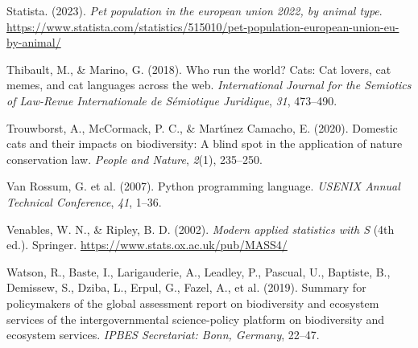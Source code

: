 \documentclass[
  man,
  longtable,
  nolmodern,
  notxfonts,
  notimes,
  colorlinks=true,linkcolor=blue,citecolor=blue,urlcolor=blue]{apa7}
\newlength{\cslhangindent}
\newenvironment{CSLReferences}[2] %
 {\begin{list}{}{%
  \setlength{\itemindent}{0pt}
  \setlength{\leftmargin}{0pt}
  \setlength{\parsep}{0pt}
  \ifodd #1
   \setlength{\leftmargin}{\cslhangindent}
   \setlength{\itemindent}{-1\cslhangindent}
  \fi
  \setlength{\itemsep}{#2\baselineskip}}}
 {\end{list}}
\begin{document}
\begin{CSLReferences}{1}{0}
Statista. (2023). \emph{Pet population in the european union 2022, by
animal type}.
\url{https://www.statista.com/statistics/515010/pet-population-european-union-eu-by-animal/}

Thibault, M., \& Marino, G. (2018). Who run the world? Cats: Cat lovers,
cat memes, and cat languages across the web. \emph{International Journal
for the Semiotics of Law-Revue Internationale de S{é}miotique
Juridique}, \emph{31}, 473--490.

Trouwborst, A., McCormack, P. C., \& Martı́nez Camacho, E. (2020).
Domestic cats and their impacts on biodiversity: A blind spot in the
application of nature conservation law. \emph{People and Nature},
\emph{2}(1), 235--250.

Van Rossum, G. et al. (2007). Python programming language.
\emph{{USENIX} Annual Technical Conference}, \emph{41}, 1--36.

Venables, W. N., \& Ripley, B. D. (2002). \emph{Modern applied
statistics with {S}} (4th ed.). Springer.
\url{https://www.stats.ox.ac.uk/pub/MASS4/}

Watson, R., Baste, I., Larigauderie, A., Leadley, P., Pascual, U.,
Baptiste, B., Demissew, S., Dziba, L., Erpul, G., Fazel, A., et al.
(2019). Summary for policymakers of the global assessment report on
biodiversity and ecosystem services of the intergovernmental
science-policy platform on biodiversity and ecosystem services.
\emph{IPBES Secretariat: Bonn, Germany}, 22--47.

\end{CSLReferences}
\end{document}
